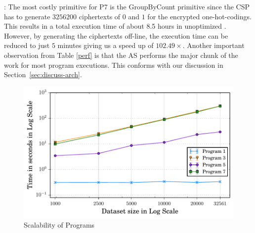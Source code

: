 :
The most costly primitive for P7 is the \textsf{GroupByCount} primitive since the \textsf{CSP} has to generate $3256200$ ciphertexts of $0$ and $1$ for the encrypted one-hot-codings. This results in a  total execution time of about 8.5 hours in unoptimized \system. However, by generating the ciphertexts off-line, the execution time can be reduced to just $5$ minutes giving us a speed up of $102.49\times$.
Another important observation from Table \ref{perf} is that the \textsf{AS} performs the major chunk of the work for most program executions. This conforms with our discussion in Section~\ref{sec:discuss-arch}.

\begin{figure}[ht]
      \includegraphics[width=0.5\linewidth]{scale_finals.pdf}
        \caption{Scalability of \system Programs }\label{scale}
    \end{figure}

